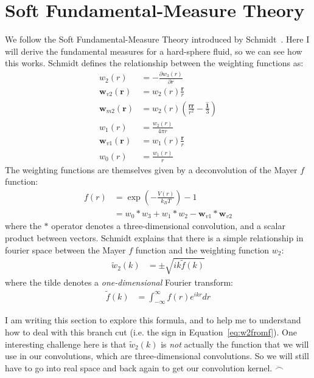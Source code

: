 \documentclass[letterpaper,twocolumn,amsmath,amssymb,prb]{revtex4-1}
\newcommand{\rr}{\textbf{r}}
\begin{document}
\appendix

\section{Soft Fundamental-Measure Theory}

We follow the Soft Fundamental-Measure Theory introduced by
Schmidt~\cite{schmidt2000fluid}.  Here I will derive the fundamental
measures for a hard-sphere fluid, so we can see how this works.
Schmidt defines the relationship between the weighting functions as:
\begin{align}
  w_2(r) &= -\frac{\partial w_3(r)}{\partial r} \\
  \mathbf{w}_{v2}(\rr) &= w_2(r)\frac{\rr}{r} \\
  \mathbf{w}_{m2}(\rr) &= w_2(r)\left( \frac{\rr \rr}{r^2}
                              - \frac{\mathbf{\hat{1}}}{3} \right) \\
  w_1(r) &= \frac{w_2(r)}{4\pi r} \\
  \mathbf{w}_{v1}(\rr) &= w_1(r) \frac{\rr}{r} \\
  w_0(r) &= \frac{w_1(r)}{r}
\end{align}
The weighting functions are themselves given by a deconvolution of the
Mayer $f$ function:
\begin{align}
  f(r) &= \exp\left(-\frac{V(r)}{k_BT}\right) - 1 \\
  &= w_0 * w_3 + w_1 * w_2 - \mathbf{w}_{v1} * \mathbf{w}_{v2}
\end{align}
where the $*$ operator denotes a three-dimensional convolution, and a
scalar product between vectors.  Schmidt explains that there is a
simple relationship in fourier space between the Mayer $f$ function
and the weighting function $w_2$:
\begin{align}
  \tilde{w}_2(k) &= \pm \sqrt{ik\tilde{f}(k)} \label{eq:w2fromf}
\end{align}
where the tilde denotes a \emph{one-dimensional} Fourier transform:
\begin{align}
  \tilde{f}(k) &= \int_{-\infty}^\infty f(r) e^{ikr} dr
\end{align}

I am writing this section to explore this formula, and to help me to
understand how to deal with this branch cut (i.e. the sign in
Equation~\ref{eq:w2fromf}).  One interesting challenge here is that
$\tilde{w}_2(k)$ is \emph{not} actually the function that we will use
in our convolutions, which are three-dimensional convolutions.  So we
will still have to go into real space and back again to get our
convolution kernel.  $\ddot\frown$
\end{document}

